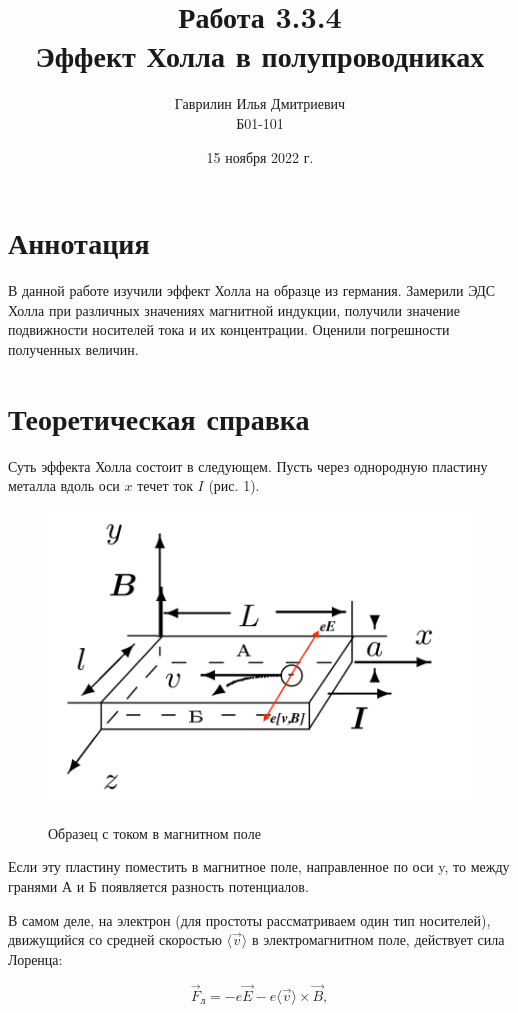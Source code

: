 \documentclass[a4paper, 12pt]{article}%
\date{15 ноября 2022 г.}
\author{Гаврилин Илья Дмитриевич \\
	Б01-101}
\title{\textbf{Работа 3.3.4 \\ 
		Эффект Холла в полупроводниках}}
\begin{document}
	\maketitle
	\section{Аннотация}
	В данной работе изучили эффект Холла на образце из германия. Замерили ЭДС Холла при различных значениях магнитной индукции, получили значение подвижности носителей тока и их концентрации. Оценили погрешности полученных величин.
	\section{Теоретическая справка}
	Суть эффекта Холла состоит в следующем. Пусть через однородную пластину металла вдоль оси $x$ течет ток $I$ (рис. 1).
	
	\begin{figure}
		\vspace{-20pt}
		\begin{center}
			\includegraphics[width=0.7\linewidth]{Holl1.png}
			\label{fig:sdfsafd}
		\end{center}
		\vspace{-20pt}
		\caption{Образец с током в магнитном поле}
	\end{figure}
	
	Если эту пластину поместить в магнитное поле, направленное по оси y, то между гранями А и Б появляется разность потенциалов. 
	
	В самом деле, на электрон (для простоты рассматриваем один тип носителей), движущийся со средней скоростью $\langle \vec{v} \rangle$ в электромагнитном поле, действует сила Лоренца:
	
	$$\vec{F}_{л} = -e\vec{E}-e \langle \vec{v} \rangle \times \vec{B},$$
	
\end{document}
